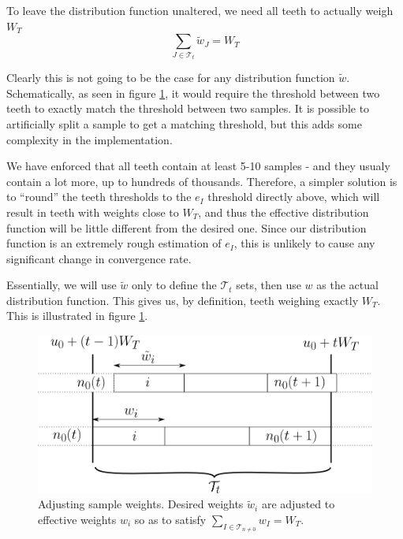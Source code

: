 \documentclass[./thesis.tex]{subfiles}
\begin{document}
To leave the distribution function unaltered, we need all teeth to actually weigh $W_T$
\begin{equation}
\sum_{J \in \mathcal{T}_t} \tilde w_J = W_T
\end{equation}

Clearly this is not going to be the case for any distribution function $\tilde w$. Schematically, as seen in figure \ref{fig:toothbuilding}, it would require the threshold between two teeth to exactly match the threshold between two samples. It is possible to artificially split a sample to get a matching threshold, but this adds some complexity in the implementation.

We have enforced that all teeth contain at least 5-10 samples - and they usualy contain a lot more, up to hundreds of thousands. Therefore, a simpler solution is to ``round'' the teeth thresholds to the $e_I$ threshold directly above, which will result in teeth with weights close to $W_T$, and thus the effective distribution function will be little different from the desired one. Since our distribution function is an extremely rough estimation of $e_I$, this is unlikely to cause any significant change in convergence rate.

Essentially, we will use $\tilde w$ only to define the $\mathcal{T}_t$ sets, then use $w$ as the actual distribution function. This gives us, by definition, teeth weighing exactly $W_T$.
This is illustrated in figure \ref{fig:toothbuilding}.
 
 \begin{figure}[h!]
	\begin{center}
		\includegraphics[width=0.9\columnwidth]{figures/pt2/toothbuilding}
	\end{center}
	\caption{Adjusting sample weights. Desired weights $\tilde w_i$ are adjusted to effective weights $w_i$ so as to satisfy $\sum_{I \in \mathcal{T}_{n \neq 0}} w_I = W_T$.}
        \label{fig:toothbuilding}
\end{figure}
\end{document}
